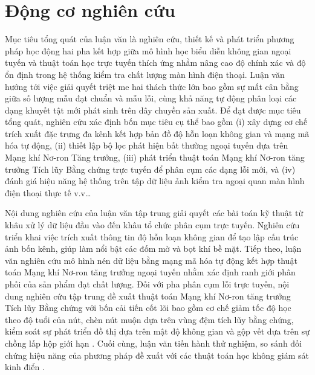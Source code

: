 \section{Động cơ nghiên cứu}

Mục tiêu tổng quát của luận văn là nghiên cứu, thiết kế và phát triển phương pháp học động hai pha kết hợp giữa mô hình học biểu diễn không gian ngoại tuyến và thuật toán học trực tuyến thích ứng nhằm nâng cao độ chính xác và độ ổn định trong hệ thống kiểm tra chất lượng màn hình điện thoại. Luận văn hướng tới việc giải quyết triệt me hai thách thức lớn bao gồm sự mất cân bằng giữa số lượng mẫu đạt chuẩn và mẫu lỗi, cùng khả năng tự động phân loại các dạng khuyết tật mới phát sinh trên dây chuyền sản xuất. Để đạt được mục tiêu tổng quát, nghiên cứu xác định bốn mục tiêu cụ thể bao gồm (i) xây dựng cơ chế trích xuất đặc trưng đa kênh kết hợp bản đồ độ hỗn loạn không gian và mạng mã hóa tự động, (ii) thiết lập bộ lọc phát hiện bất thường ngoại tuyến dựa trên Mạng khí Nơ-ron Tăng trưởng, (iii) phát triển thuật toán Mạng khí Nơ-ron tăng trưởng Tích lũy Bằng chứng trực tuyến để phân cụm các dạng lỗi mới, và (iv) đánh giá hiệu năng hệ thống trên tập dữ liệu ảnh kiểm tra ngoại quan màn hình điện thoại thực tế v.v…

Nội dung nghiên cứu của luận văn tập trung giải quyết các bài toán kỹ thuật từ khâu xử lý dữ liệu đầu vào đến khâu tổ chức phân cụm trực tuyến. Nghiên cứu triển khai việc trích xuất thông tin độ hỗn loạn không gian để tạo lập cấu trúc ảnh bốn kênh, giúp làm nổi bật các đốm mờ và bọt khí bề mặt. Tiếp theo, luận văn nghiên cứu mô hình nén dữ liệu bằng mạng mã hóa tự động kết hợp thuật toán Mạng khí Nơ-ron tăng trưởng ngoại tuyến nhằm xác định ranh giới phân phối của sản phẩm đạt chất lượng. Đối với pha phân cụm lỗi trực tuyến, nội dung nghiên cứu tập trung đề xuất thuật toán Mạng khí Nơ-ron tăng trưởng Tích lũy Bằng chứng với bốn cải tiến cốt lõi bao gồm cơ chế giảm tốc độ học theo độ tuổi của nút, chèn nút muộn dựa trên vùng đệm tích lũy bằng chứng, kiểm soát sự phát triển đồ thị dựa trên mật độ không gian và gộp vết dựa trên sự chồng lấp hộp giới hạn \cite{fritzke1995growing}. Cuối cùng, luận văn tiến hành thử nghiệm, so sánh đối chứng hiệu năng của phương pháp đề xuất với các thuật toán học không giám sát kinh điển \cite{martinetz1993neural}.

